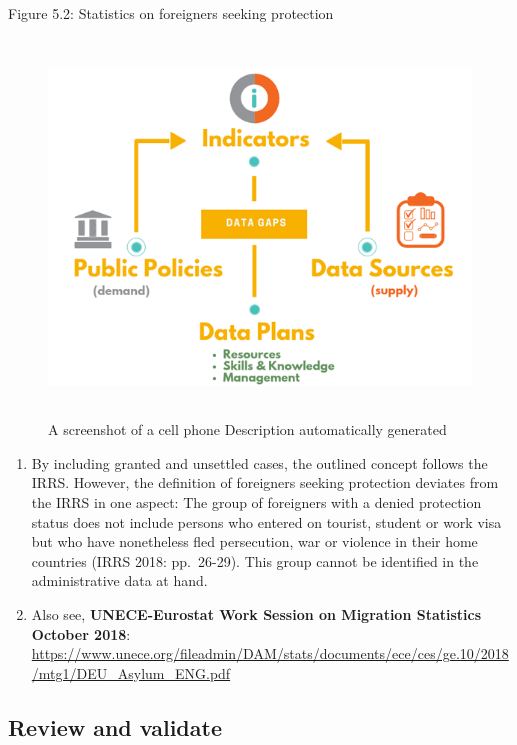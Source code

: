 \documentclass[
]{article}
\begin{document}
Figure 5.2: Statistics on foreigners seeking protection

\begin{figure}
\centering
\includegraphics[width=6.4503in,height=3.93819in]{media/image2.png}
\caption{A screenshot of a cell phone Description automatically
generated}
\end{figure}

\begin{enumerate}
\def\labelenumi{\arabic{enumi}.}
\setcounter{enumi}{379}
\item
  By including granted and unsettled cases, the outlined concept
  follows the IRRS. However, the definition of foreigners seeking
  protection deviates from the IRRS in one aspect: The group of
  foreigners with a denied protection status does not include persons
  who entered on tourist, student or work visa but who have
  nonetheless fled persecution, war or violence in their home
  countries (IRRS 2018: pp.~26-29). This group cannot be identified in
  the administrative data at hand.
\item
  Also see, \textbf{UNECE-Eurostat Work Session on Migration Statistics
  October 2018}:
  \url{https://www.unece.org/fileadmin/DAM/stats/documents/ece/ces/ge.10/2018/mtg1/DEU_Asylum_ENG.pdf}
\end{enumerate}

\hypertarget{review-and-validate}{%
\subsection{Review and validate}\label{review-and-validate}}
\end{document}

